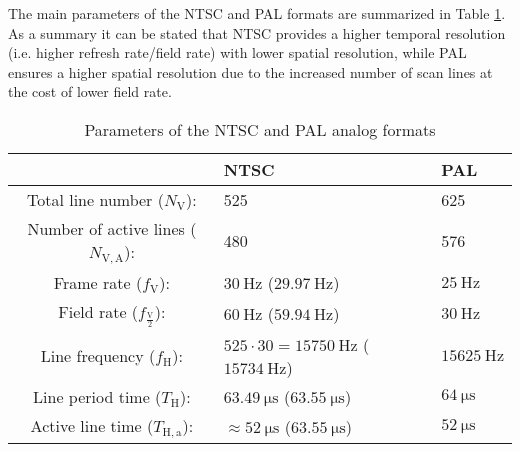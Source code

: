 The main parameters of the NTSC and PAL formats are summarized in Table \ref{tab:sd_formats}.
As a summary it can be stated that NTSC provides a higher temporal resolution (i.e. higher refresh rate/field rate) with lower spatial resolution, while PAL ensures a higher spatial resolution due to the increased number of scan lines at the cost of lower field rate.

\begin{table}[h!]
\caption{Parameters of the NTSC and PAL analog formats}
\renewcommand*{\arraystretch}{2.25}
\label{tab:sd_formats}
\begin{center}
    \begin{tabular}[h!]{ @{}c | | l | l @{} }%
				         &   NTSC  							       & PAL \\ \hline
    Total line number ($N_{\mathrm{V}}$):	 &  525   								   &  625 \\
    Number of active lines ($N_{\mathrm{V,A}}$):   &  480   								   &  576 \\
    Frame rate ($f_{\mathrm{V}}$):    &  $30~\mathrm{Hz}$ ($29.97~\mathrm{Hz}$) & $25~\mathrm{Hz}$ \\
    Field rate ($f_{\frac{\mathrm{V}}{2}}$): &  $60~\mathrm{Hz}$ ($59.94~\mathrm{Hz}$) & $30~\mathrm{Hz}$ \\
    Line frequency ($f_{\mathrm{H}}$):    &  $525 \cdot 30 = 15750~\mathrm{Hz}$ ($15734~\mathrm{Hz}$) & $15625~\mathrm{Hz}$ \\
    Line period time ($T_{\mathrm{H}}$):           &  $63.49~\mathrm{\mu s}$ ($63.55~\mathrm{\mu s}$) & $64~\mathrm{\mu s}$ \\
    Active line time ($T_{\mathrm{H,a}}$):           &  $\approx 52 ~\mathrm{\mu s}$ ($63.55~\mathrm{\mu s}$) & $52~\mathrm{\mu s}$ \\
    \end{tabular}
\end{center}
\end{table}

